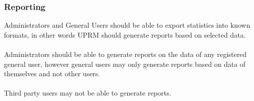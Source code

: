 \subsubsection{Reporting}
Administrators and General Users should be able to export statistics into known formats, in other words UPRM should generate reports based on selected data.\\ \\
Administrators should be able to generate reports on the data of any registered general user, however general users may only generate reports based on data of themselves and not other users.\\ \\
Third party users may not be able to generate reports.

